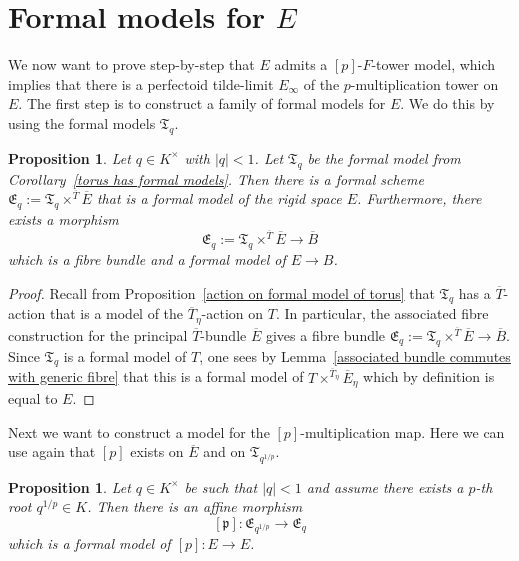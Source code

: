 \documentclass[11pt,oneside]{amsart}
\newtheorem{proposition}[theorem]{Proposition}
\theoremstyle{definition}
\theoremstyle{remark}
\begin{document}
	\section{Formal models for $E$}
	We now want to prove step-by-step that $E$ admits a $[p]$-$F$-tower model, which implies that there is a perfectoid tilde-limit $E_\infty$ of the $p$-multiplication tower on $E$.
	The first step is to construct a family of formal models for $E$. We do this by using the formal models $\mathfrak T_q$.
	\begin{proposition}
	Let $q\in K^\times$ with $|q|<1$. Let $\mathfrak T_q$ be the formal model from Corollary~\ref{torus has formal models}. Then there is a formal scheme $\mathfrak E_q :=\mathfrak T_q \times^{\overline{T}}\overline{E}$ that is a formal model of the rigid space $E$. Furthermore, there exists a morphism
	\[\mathfrak E_q :=\mathfrak T_q \times^{\overline{T}} \overline{E} \rightarrow \overline{B} \]
	which is a fibre bundle and a formal model of $E\rightarrow B$.
	\end{proposition}
	\begin{proof}
		Recall from Proposition~\ref{action on formal model of torus} that $\mathfrak T_q$ has a $\overline{T}$-action that is a model of the $\overline{T}_\eta$-action on $T$. In particular, the associated fibre construction for the principal $\overline{T}$-bundle $\overline{E}$ gives a fibre bundle $\mathfrak E_q :=\mathfrak T_q \times^{\overline{T}} \overline{E} \rightarrow \overline{B}$. Since $\mathfrak T_q$ is a formal model of $T$, one sees by Lemma~\ref{associated bundle commutes with generic fibre} that this is a formal model of $T\times^{\overline{T}_\eta}\overline{E}_\eta$ which by definition is equal to $E$.
	\end{proof}
	Next we want to construct a model for the $[p]$-multiplication map. Here we can use again that $[p]$ exists on $\overline{E}$ and on $\mathfrak T_{q^{1/p}}$.
	\begin{proposition}\label{formal model of p-multiplication on E}
		Let $q\in K^\times$ be such that $|q|<1$ and assume there exists a $p$-th root $q^{1/p}\in K$. Then there is an affine morphism
		\[[\mathfrak p]:\mathfrak E_{q^{1/p}} \rightarrow  \mathfrak E_{q}\]
		which is a formal model of $[p]:E\rightarrow E$.
	\end{proposition}
\end{document}

